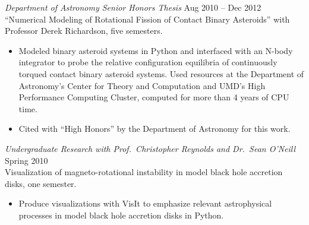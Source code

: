 \documentclass[margin]{res}
\begin{document}
\begin{resume}
      {\sl Department of Astronomy Senior Honors Thesis} \hfill Aug 2010 -- Dec 2012 \\
                ``Numerical Modeling of Rotational Fission of Contact Binary Asteroids'' with Professor Derek Richardson, five semesters. 
                 \begin{itemize}   
                 \item Modeled binary asteroid systems in Python and interfaced with an N-body integrator to probe the relative configuration equilibria of continuously torqued 
contact binary asteroid systems. Used resources at the Department of Astronomy's Center for Theory and Computation 
and UMD's High Performance Computing Cluster, computed for more than 4 years of CPU time. 
                \item  Cited with ``High Honors'' by the Department of Astronomy for this work.
                \end{itemize}

                {\sl Undergraduate Research with Prof.\ Christopher Reynolds and Dr.\ Sean O'Neill} \hfill        Spring 2010 \\
                Visualization of magneto-rotational instability in model black hole accretion disks, one semester.
                  \begin{itemize}  
                   \item Produce visualizations with VisIt to emphasize relevant astrophysical processes in model black hole accretion disks in Python. \\
                   \end{itemize} 


\end{resume}
\end{document}
